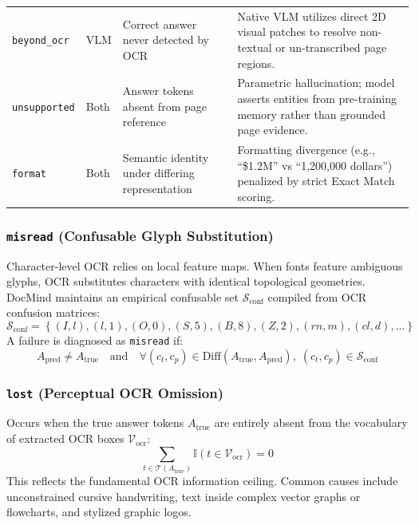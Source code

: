 \documentclass[conference]{IEEEtran}
\begin{document}
\begin{table}[!t]
\begin{center}
\begin{tabular}{lllp{8.5cm}}
\texttt{beyond\_ocr} & VLM & Correct answer never detected by OCR & Native VLM utilizes direct 2D visual patches to resolve non-textual or un-transcribed page regions. \\
\texttt{unsupported} & Both & Answer tokens absent from page reference & Parametric hallucination; model asserts entities from pre-training memory rather than grounded page evidence. \\
\texttt{format} & Both & Semantic identity under differing representation & Formatting divergence (e.g., ``\$1.2M'' vs ``1,200,000 dollars'') penalized by strict Exact Match scoring. \\
\bottomrule
\end{tabular}
\end{center}
\end{table}

\subsubsection{\texttt{misread} (Confusable Glyph Substitution)}
Character-level OCR relies on local feature maps. When fonts feature ambiguous glyphs, OCR substitutes characters with identical topological geometries. DocMind maintains an empirical confusable set $\mathcal{S}_{\text{conf}}$ compiled from OCR confusion matrices:
\begin{equation}
    \mathcal{S}_{\text{conf}} = \left\{ (I, l), (l, 1), (O, 0), (S, 5), (B, 8), (Z, 2), (rn, m), (cl, d), \dots \right\}
    \label{eq:confusables}
\end{equation}
A failure is diagnosed as \texttt{misread} if:
\begin{equation}
    A_{\text{pred}} \neq A_{\text{true}} \quad \text{and} \quad \forall (c_t, c_p) \in \text{Diff}(A_{\text{true}}, A_{\text{pred}}), \; (c_t, c_p) \in \mathcal{S}_{\text{conf}}
    \label{eq:misread_rule}
\end{equation}

\subsubsection{\texttt{lost} (Perceptual OCR Omission)}
Occurs when the true answer tokens $A_{\text{true}}$ are entirely absent from the vocabulary of extracted OCR boxes $\mathcal{V}_{\text{ocr}}$:
\begin{equation}
    \sum_{t \in \mathcal{T}(A_{\text{true}})} \mathbb{I}(t \in \mathcal{V}_{\text{ocr}}) = 0
    \label{eq:lost_rule}
\end{equation}
This reflects the fundamental OCR information ceiling. Common causes include unconstrained cursive handwriting, text inside complex vector graphs or flowcharts, and stylized graphic logos.
\end{document}
